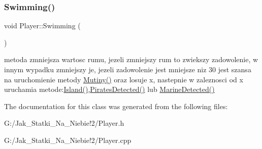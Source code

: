 \subsubsection{\texorpdfstring{Swimming()}{Swimming()}}
{\footnotesize\ttfamily void Player\+::\+Swimming (\begin{DoxyParamCaption}{ }\end{DoxyParamCaption})}

metoda zmniejsza wartosc rumu, jezeli zmniejszy rum to zwiekszy zadowolenie, w innym wypadku zmniejszy je, jezeli zadowolenie jest mniejsze niz 30 jest szansa na uruchomienie metody \hyperlink{class_player_a00d925d7fbf8af5eb7aaae82667d4968}{Mutiny()} oraz losuje x, nastepnie w zaleznosci od x uruchamia metode\+:\hyperlink{class_player_afc2b87dc8abe8dfc5ea7f62503e18810}{Island()},\hyperlink{class_player_a305da8fa45422dcd8fe3d5f92e4c6c7f}{Pirates\+Detected()} lub \hyperlink{class_player_a34f7b1e13c7b3a7bba123ab7bff1cfba}{Marine\+Detected()} 

The documentation for this class was generated from the following files\+:\begin{DoxyCompactItemize}
\item 
G\+:/\+Jak\+\_\+\+Statki\+\_\+\+Na\+\_\+\+Niebie!2/Player.\+h\item 
G\+:/\+Jak\+\_\+\+Statki\+\_\+\+Na\+\_\+\+Niebie!2/Player.\+cpp\end{DoxyCompactItemize}

